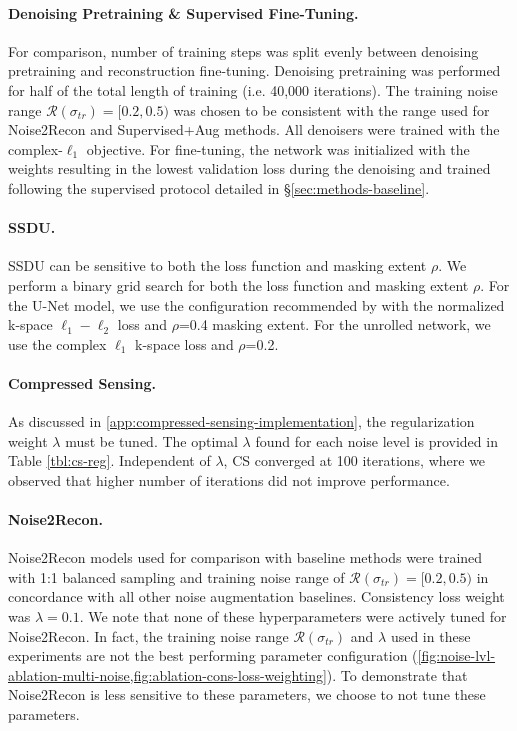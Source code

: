 \documentclass[10pt,twocolumn,letterpaper]{article}
\newcommand{\noiserange}{\mathcal{R}(\sigma_{tr})}
\newcommand{\RV}[1]{{#1}}
\begin{document}
\paragraph{Denoising Pretraining \& Supervised Fine-Tuning.} For comparison, number of training steps was split evenly between denoising pretraining and reconstruction fine-tuning. Denoising pretraining was performed for half of the total length of training (i.e. 40,000 iterations). The training noise range $\noiserange=[0.2, 0.5)$ was chosen to be consistent with the range used for Noise2Recon and Supervised+Aug methods. All denoisers were trained with the complex-$\ell_1$ objective. For fine-tuning, the network was initialized with the weights resulting in the lowest validation loss during the denoising and trained following the supervised protocol detailed in \S\ref{sec:methods-baseline}. 

\paragraph{SSDU.} SSDU can be sensitive to both the loss function and masking extent $\rho$. \RV{We perform a binary grid search for both the loss function and masking extent $\rho$.} For the U-Net model, we use the configuration recommended by \cite{Yaman_self} with the normalized k-space $\ell_1-\ell_2$ loss and $\rho$=0.4 masking extent. \RV{For the unrolled network, we use the complex $\ell_1$ k-space loss and  $\rho$=0.2.}

\paragraph{Compressed Sensing.} As discussed in \cref{app:compressed-sensing-implementation}, the regularization weight $\lambda$ must be tuned. The optimal $\lambda$ found for each noise level is provided in Table \ref{tbl:cs-reg}. Independent of $\lambda$, CS converged at 100 iterations, where we observed that higher number of iterations did not improve performance.

\paragraph{Noise2Recon.} Noise2Recon models used for comparison with baseline methods were trained with 1:1 balanced sampling and training noise range of $\noiserange=[0.2,0.5)$ in concordance with all other noise augmentation baselines. Consistency loss weight was $\lambda=0.1$. We note that none of these hyperparameters were actively tuned for Noise2Recon. In fact, the training noise range $\noiserange$ and $\lambda$ used in these experiments are not the best performing parameter configuration (\cref{fig:noise-lvl-ablation-multi-noise,fig:ablation-cons-loss-weighting}). To demonstrate that Noise2Recon is less sensitive to these parameters, we choose to not tune these parameters.
\end{document}
